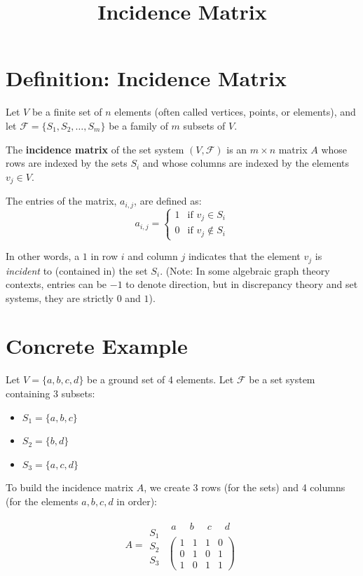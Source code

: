 \documentclass[11pt]{article}
\title{Incidence Matrix}
\author{}
\date{}
\begin{document}
\maketitle

\section{Definition: Incidence Matrix}

Let \(V\) be a finite set of \(n\) elements (often called vertices, points, or elements), and let \(\mathcal{F} = \{S_1, S_2, \dots, S_m\}\) be a family of \(m\) subsets of \(V\). 

The \textbf{incidence matrix} of the set system \((V, \mathcal{F})\) is an \(m \times n\) matrix \(A\) whose rows are indexed by the sets \(S_i\) and whose columns are indexed by the elements \(v_j \in V\). 

The entries of the matrix, \(a_{i,j}\), are defined as:
\[
 a_{i,j} = \begin{cases} 1 & \text{if } v_j \in S_i \\ 0 & \text{if } v_j \notin S_i \end{cases} 
\]

In other words, a \(1\) in row \(i\) and column \(j\) indicates that the element \(v_j\) is \emph{incident} to (contained in) the set \(S_i\). (Note: In some algebraic graph theory contexts, entries can be \(-1\) to denote direction, but in discrepancy theory and set systems, they are strictly \(0\) and \(1\)).

\hrulefill

\section{Concrete Example}

Let \(V = \{a, b, c, d\}\) be a ground set of 4 elements.
Let \(\mathcal{F}\) be a set system containing 3 subsets:
\begin{itemize}
    \item \(S_1 = \{a, b, c\}\)
    \item \(S_2 = \{b, d\}\)
    \item \(S_3 = \{a, c, d\}\)
\end{itemize}

To build the incidence matrix \(A\), we create 3 rows (for the sets) and 4 columns (for the elements \(a, b, c, d\) in order):

\[
A = \begin{array}{c} \\ S_1 \\ S_2 \\ S_3 \end{array}
\begin{array}{c} 
\begin{matrix} a & \;\; b & \;\; c & \;\; d \end{matrix} \\
\begin{pmatrix}
1 & 1 & 1 & 0 \\
0 & 1 & 0 & 1 \\
1 & 0 & 1 & 1 
\end{pmatrix}
\end{array}
\]
\end{document}
